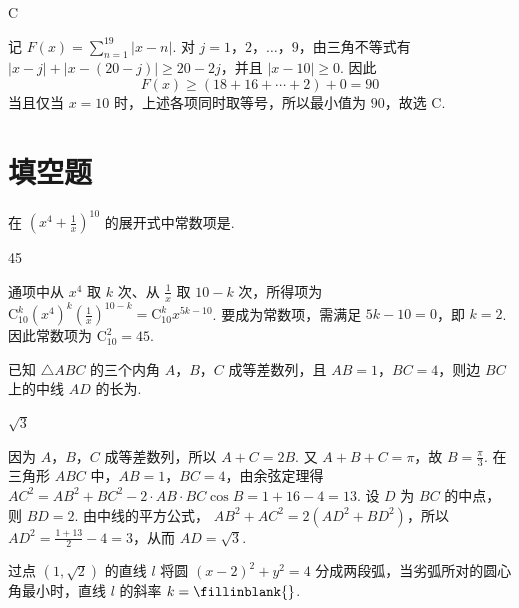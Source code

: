 \begin{answer}
C
\end{answer}

\begin{solution}
记 \(F(x)=\sum_{n=1}^{19}\lvert x-n\rvert\). 对 \(j=1\)，\(2\)，\(\dots\)，\(9\)，由三角不等式有
\(\lvert x-j\rvert+\lvert x-(20-j)\rvert\geq 20-2j\)，并且 \(\lvert x-10\rvert\geq0\). 因此
\[
 F(x)\geq(18+16+\cdots+2)+0=90
\]
当且仅当 \(x=10\) 时，上述各项同时取等号，所以最小值为 \(90\)，故选 C.
\end{solution}

\section{填空题}
\begin{problem}
在 \(\left(x^{4} + \frac{1}{x}\right)^{10}\) 的展开式中常数项是\fillinblank{}.
\end{problem}

\begin{answer}
45
\end{answer}

\begin{solution}
通项中从 \(x^4\) 取 \(k\) 次、从 \(\frac1x\) 取 \(10-k\) 次，所得项为
\(\mathrm C_{10}^{k}(x^4)^k\left(\frac1x\right)^{10-k}=\mathrm C_{10}^{k}x^{5k-10}\). 要成为常数项，需满足 \(5k-10=0\)，即 \(k=2\). 因此常数项为 \(\mathrm C_{10}^{2}=45\).
\end{solution}

\begin{problem}
已知 \(\triangle ABC\) 的三个内角 \(A\)，\(B\)，\(C\) 成等差数列，且 \(AB = 1\)，\(BC = 4\)，则边 \(BC\) 上的中线 \(AD\) 的长为\fillinblank{}.
\end{problem}

\begin{answer}
\(\sqrt{3}\)
\end{answer}

\begin{solution}
因为 \(A\)，\(B\)，\(C\) 成等差数列，所以 \(A+C=2B\). 又 \(A+B+C=\pi\)，故 \(B=\frac\pi3\). 在三角形 \(ABC\) 中，\(AB=1\)，\(BC=4\)，由余弦定理得
\(AC^2=AB^2+BC^2-2\cdot AB\cdot BC\cos B=1+16-4=13\).
设 \(D\) 为 \(BC\) 的中点，则 \(BD=2\). 由中线的平方公式，
\(AB^2+AC^2=2(AD^2+BD^2)\)，所以 \(AD^2=\frac{1+13}{2}-4=3\)，从而 \(AD=\sqrt3\).
\end{solution}

\begin{problem}
过点 \((1, \sqrt{2})\) 的直线 \(l\) 将圆 \((x - 2)^2 + y^2 = 4\) 分成两段弧，当劣弧所对的圆心角最小时，直线 \(l\) 的斜率 \(k =\fillinblank{}\).
\end{problem}

